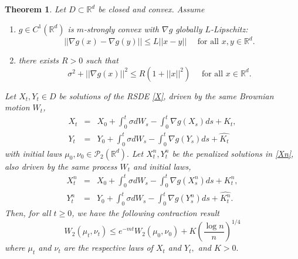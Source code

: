 \documentclass[amsfonts, reqno]{amsart}
\newtheorem{thm}{Theorem}[section]
\theoremstyle{definition}
\theoremstyle{remark}
\newcommand{\bbR}{\mathbb{R}}
\numberwithin{equation}{section}
\begin{document}
\begin{thm}\label{error contraction}
    Let $D \subset \bbR^d$ be closed and convex. Assume \begin{enumerate}
        \item[(A1)] $g \in C^1(\bbR^d)$ is $m$-strongly convex with $\nabla g$ globally $L$-Lipschitz: \[
        ||\nabla g(x) - \nabla g(y)|| \leq L ||x-y|| \quad \text{ for all } x,y \in \bbR^d.
        \] 
        \item[(A2)] there exists $R > 0$ such that \[
        \sigma^2 + ||\nabla g(x)||^2 \leq R(1 + ||x||^2) \quad \text{ for all } x \in \bbR^d.
        \]
    \end{enumerate} Let $X_t, Y_t \in D$ be solutions of the RSDE \eqref{X}, driven by the same Brownian motion $W_t$, \begin{eqnarray*}
        X_t &= &X_0 + \int_{0}^{t} \sigma dW_s -\int_{0}^{t}\nabla g(X_s) ds +K_t, \\ Y_t &=& Y_0 + \int_{0}^{t} \sigma dW_s -\int_{0}^{t}\nabla g(Y_s) ds + \hat{K_t}
    \end{eqnarray*}
    with initial laws $\mu_0, \nu_0 \in \mathcal{P}_2(\bbR^d).$
    Let $X_t^n, Y_t^n$ be the penalized solutions in \eqref{Xn}, also driven by the same process $W_t$ and initial laws,
    \begin{eqnarray*}
        X_t^n &=& X_0 + \int_{0}^{t} \sigma dW_s -\int_{0}^{t}\nabla g(X_s^n) ds +K_t^n, \\ Y_t^n &= &Y_0 + \int_{0}^{t} \sigma dW_s -\int_{0}^{t}\nabla g(Y_s^n) ds + \hat{K_t^n}.
    \end{eqnarray*}
   Then, for all $t \geq 0$, we have the following contraction result 
    \begin{equation*}
        W_2(\mu_t, \nu_t) \leq e^{-mt}W_2(\mu_0, \nu_0) + K\left( \frac{\log n}{n} \right)^{1/4}
    \end{equation*}
    where $\mu_t$ and $\nu_t$ are the respective laws of $X_t$ and $Y_t,$ and $K > 0.$
\end{thm}
\end{document}
